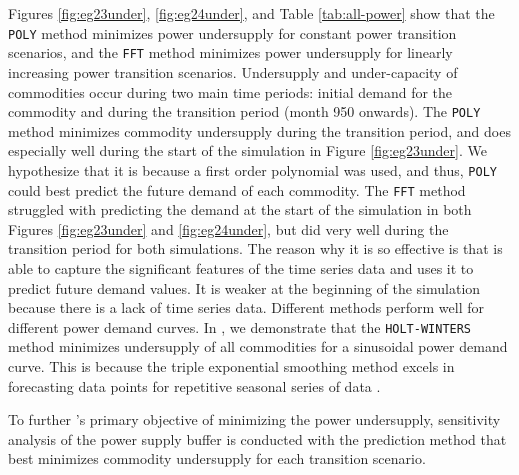 Figures \ref{fig:eg23under}, \ref{fig:eg24under}, and Table 
\ref{tab:all-power} show that the \texttt{POLY} method 
minimizes power undersupply for constant power transition scenarios, 
and the \texttt{FFT} method minimizes power undersupply for linearly increasing 
power transition scenarios. 
Undersupply and under-capacity of commodities occur during two main time periods: 
initial demand for the commodity and during the transition period (month 950 onwards).
The \texttt{POLY} method minimizes commodity undersupply during the transition period, 
and does especially well during the start of the simulation in Figure \ref{fig:eg23under}. 
We hypothesize that it is because a first order polynomial was used, and thus, \texttt{POLY}
could best predict the future demand of each commodity. 
The \texttt{FFT} method struggled with predicting the demand at the start of the simulation
in both Figures \ref{fig:eg23under} and \ref{fig:eg24under}, 
but did very well during the transition period for both simulations. 
The reason why it is so effective is that is able to capture the significant features 
of the time series data and uses it to predict future demand values. 
It is weaker at the beginning of the simulation because there is a lack of time series data. 
Different methods perform well for different power demand curves. In 
\cite{chee_demonstration_2019}, we demonstrate that the \texttt{HOLT-WINTERS} method 
minimizes undersupply of all commodities for a sinusoidal power demand curve. 
This is because the triple exponential smoothing
method excels in forecasting data points for repetitive seasonal
series of data \cite{chee_demonstration_2019}.

To further \deploy's primary objective of minimizing the power undersupply, 
sensitivity analysis of the power supply buffer is conducted 
with the prediction method that best minimizes commodity undersupply for 
each transition scenario.  

